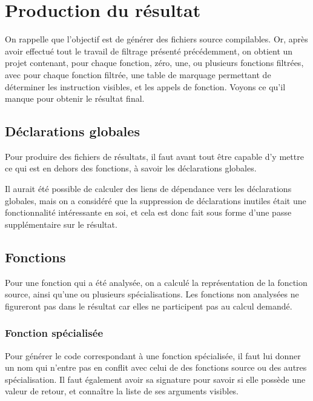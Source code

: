 
\section{Production du résultat}

On rappelle que l'objectif est de générer des fichiers source compilables.
Or, après avoir effectué tout le travail de filtrage présenté précédemment,
on obtient un projet contenant, pour chaque fonction, zéro, une, ou plusieurs
fonctions filtrées, avec pour chaque fonction filtrée, une table de marquage
permettant de déterminer les instruction visibles,
et les appels de fonction.
Voyons ce qu'il manque pour obtenir le résultat final.

\subsection{Déclarations globales}

Pour produire des fichiers de résultats, il faut avant tout être capable d'y
mettre ce qui est en dehors des fonctions, à savoir les déclarations globales.

Il aurait été possible de calculer des liens de dépendance vers les déclarations
globales, mais on a considéré que la suppression de 
déclarations inutiles était une fonctionnalité intéressante en soi,
et cela est donc fait sous forme d'une passe supplémentaire sur le résultat.

\subsection{Fonctions}

Pour une fonction qui a été analysée, on a calculé la représentation de la
fonction source, ainsi qu'une ou plusieurs spécialisations.
Les fonctions non analysées ne figureront pas dans le résultat
car elles ne participent pas au calcul demandé.

\subsubsection{Fonction spécialisée}

Pour générer le code correspondant à une fonction spécialisée,
il faut lui donner un nom qui n'entre pas en conflit avec celui de des fonctions
source ou des autres spécialisation.
Il faut également avoir sa signature pour savoir si elle possède une valeur
de retour, et connaître la liste de ses arguments visibles.


